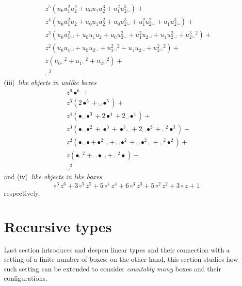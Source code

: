 \begin{example}
\begin{displaymath}
\begin{split}
&z^{5} \left(u_{0} u_{1}^{2} u_{2}^{2} + u_{0} u_{1} u_{2}^{3} + u_{1}^{2} u_{2}^{3} ␣\right) + \\
&z^{4} \left(u_{0} u_{1}^{2} u_{2} + u_{0} u_{1} u_{2}^{2} + u_{0} u_{2}^{3} ␣ + u_{1}^{2} u_{2}^{2} ␣ + u_{1} u_{2}^{3} ␣\right) + \\
&z^{3} \left(u_{0} u_{1}^{2} ␣ + u_{0} u_{1} u_{2} + u_{0} u_{2}^{2} ␣ + u_{1}^{2} u_{2} ␣ + u_{1} u_{2}^{2} ␣ + u_{2}^{3} ␣^{2}\right) + \\
&z^{2} \left(u_{0} u_{1} ␣ + u_{0} u_{2} ␣ + u_{1}^{2} ␣^{2} + u_{1} u_{2} ␣ + u_{2}^{2} ␣^{2}\right) + \\
&z \left(u_{0} ␣^{2} + u_{1} ␣^{2} + u_{2} ␣^{2}\right) + \\
&␣^{3}
\end{split}
\end{displaymath}
(iii)~\textit{like objects in unlike boxes}
\begin{displaymath}
\begin{split}
&z^{6} \bullet^{6} + \\
&z^{5} \left(2 \bullet^{5} + ␣ \bullet^{5}\right) + \\
&z^{4} \left(\bullet ␣ \bullet^{3} + 2 \bullet^{4} + 2 ␣ \bullet^{4}\right) + \\
&z^{3} \left(\bullet ␣ \bullet^{2} + \bullet^{3} + \bullet^{3} ␣ + 2 ␣ \bullet^{3} + ␣^{2} \bullet^{3}\right) + \\
&z^{2} \left(\bullet ␣ \bullet + \bullet^{2} ␣ + ␣ \bullet^{2} + ␣ \bullet^{2} ␣ + ␣^{2} \bullet^{2}\right) + \\
&z \left(\bullet ␣^{2} + ␣ \bullet ␣ + ␣^{2} \bullet\right) + \\
&␣^{3}
\end{split}
\end{displaymath}
and (iv)~\textit{like objects in like boxes}
\begin{displaymath}
\circ^{6} z^{6} + 3 \circ^{5} z^{5} + 5 \circ^{4} z^{4} + 6 \circ^{3} z^{3} + 5 \circ^{2} z^{2} + 3 \circ z + 1
\end{displaymath}
respectively.
\end{example}

\section{Recursive types}

Last section introduces and deepen linear types and their connection with a
setting of a finite number of boxes; on the other hand, this section studies
how such setting can be extended to consider \textit{countably many} boxes and
their configurations. 

